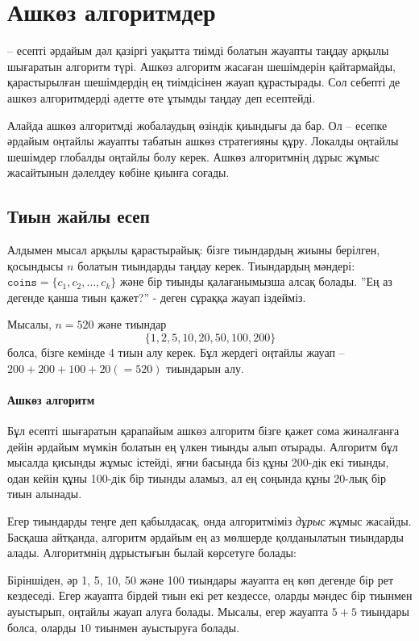 \chapter{Ашкөз алгоритмдер}


 -- есепті әрдайым 
дәл қазіргі уақытта  тиімді болатын жауапты 
таңдау арқылы шығаратын алгоритм түрі.
Ашкөз алгоритм жасаған шешімдерін қайтармайды,
қарастырылған шешімдердің ең тиімдісінен жауап құрастырады. 
Сол себепті де ашкөз алгоритмдерді әдетте өте
ұтымды таңдау деп есептейді.

Алайда ашкөз алгоритмді жобалаудың өзіндік қиындығы да бар. Ол -- 
есепке әрдайым оңтайлы жауапты 
табатын ашкөз стратегияны құру.
Локалды оңтайлы шешімдер глобалды 
оңтайлы болу керек. Ашкөз алгоритмнің
дұрыс жұмыс жасайтынын дәлелдеу көбіне қиынға соғады.

\section{Тиын жайлы есеп}

Алдымен мысал арқылы қарастырайық:
бізге тиындардың жиыны берілген, қосындысы 
$n$ болатын тиындарды таңдау керек. 
Тиындардың мәндері: $\texttt{coins}=\{c_1,c_2,\ldots,c_k\}$ 
және бір тиынды қалағанымызша алсақ болады.
''Ең аз дегенде қанша тиын қажет?'' - деген сұраққа жауап іздейміз.

Мысалы, $n=520$ және тиындар 
\[\{1,2,5,10,20,50,100,200\}\]
болса, бізге кемінде 4 тиын алу керек.
Бұл жердегі оңтайлы жауап  -- $200+200+100+20(=520)$ тиындарын алу.

\subsubsection{Ашкөз алгоритм}

Бұл есепті шығаратын қарапайым ашкөз алгоритм бізге қажет сома жиналғанға дейін әрдайым мүмкін болатын ең үлкен тиынды алып отырады. Алгоритм бұл мысалда қисынды жұмыс істейді, яғни
басында біз құны 200-дік екі тиынды, одан кейін құны 100-дік бір тиынды аламыз, ал ең соңында құны 20-лық бір тиын алынады. 

Егер тиындарды теңге деп қабылдасақ, онда алгоритміміз \emph{дұрыс}
жұмыс жасайды. Басқаша айтқанда, алгоритм әрдайым
ең аз мөлшерде қолданылатын тиындарды алады. Алгоритмнің
дұрыстығын былай көрсетуге болады:

Біріншіден, әр 1, 5, 10, 50 және 100 тиындары
жауапта ең көп дегенде бір рет кездеседі.
Егер жауапта бірдей тиын екі рет кездессе, 
оларды мәндес бір тиынмен ауыстырып, оңтайлы 
жауап алуға болады. Мысалы, егер жауапта $5+5$ тиындары
болса, оларды $10$ тиынмен ауыстыруға болады.

